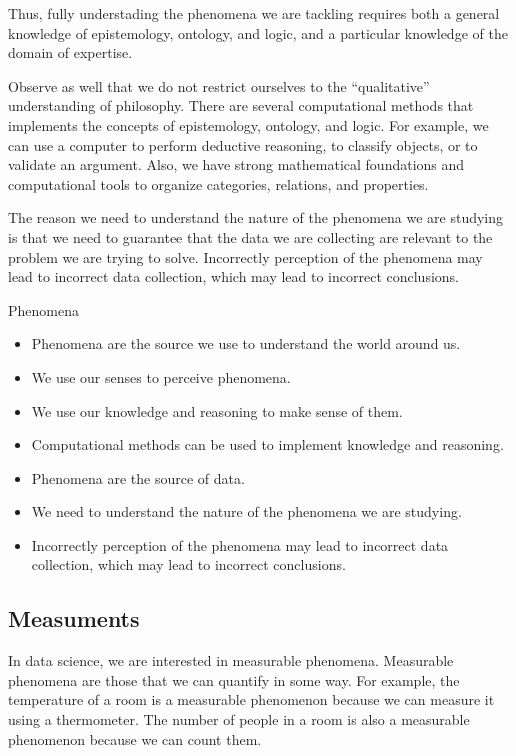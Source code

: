 Thus, fully understading the phenomena we are tackling requires both a general knowledge
of epistemology, ontology, and logic, and a particular knowledge of the domain of
expertise.

Observe as well that we do not restrict ourselves to the ``qualitative'' understanding of
philosophy.  There are several computational methods that implements the concepts of
epistemology, ontology, and logic.  For example, we can use a computer to perform
deductive reasoning, to classify objects, or to validate an argument.  Also, we have
strong mathematical foundations and computational tools to organize categories, relations, and
properties.

The reason we need to understand the nature of the phenomena we are studying is that we
need to guarantee that the data we are collecting are relevant to the problem we are
trying to solve.  Incorrectly perception of the phenomena may lead to incorrect data
collection, which may lead to incorrect conclusions.

\begin{slidebox}{Phenomena}{}
  \begin{itemize}
    \item Phenomena are the source we use to understand the world around us.
    \item We use our senses to perceive phenomena.
    \item We use our knowledge and reasoning to make sense of them.
    \item Computational methods can be used to implement knowledge and reasoning.
    \item Phenomena are the source of data.
    \item We need to understand the nature of the phenomena we are studying.
    \item Incorrectly perception of the phenomena may lead to incorrect data collection,
      which may lead to incorrect conclusions.
  \end{itemize}
\end{slidebox}

\subsection{Measuments}

In data science, we are interested in measurable phenomena.  Measurable phenomena are
those that we can quantify in some way.  For example, the temperature of a room is a
measurable phenomenon because we can measure it using a thermometer.  The number of
people in a room is also a measurable phenomenon because we can count them.

